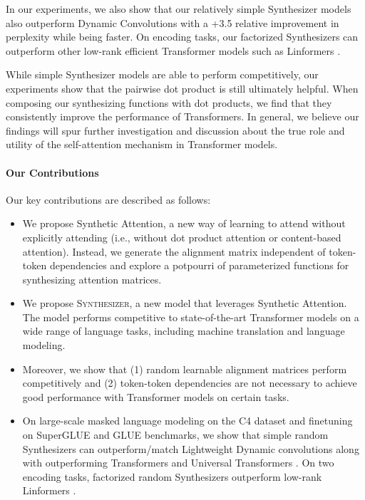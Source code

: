 \documentclass{article}
\begin{document}
In our experiments, we also show that our relatively simple Synthesizer models also outperform Dynamic Convolutions \citep{wu2019pay} with a +3.5 relative improvement in perplexity while being  faster. On encoding tasks, our factorized Synthesizers can outperform other low-rank efficient Transformer models such as Linformers \citep{wang2020linformer}.

While simple Synthesizer models are able to perform competitively, our experiments show that the pairwise dot product is still ultimately helpful. When composing our synthesizing functions with dot products, we find that they consistently improve the performance of Transformers. In general, we believe our findings will spur further investigation and discussion about the true role and utility of the self-attention mechanism in Transformer models.



\paragraph{Our Contributions}
Our key contributions are described as follows:
\begin{itemize}
\item We propose Synthetic Attention, a new way of learning to attend without explicitly attending (i.e., without dot product attention or content-based attention). Instead, we generate the alignment matrix independent of token-token dependencies and explore a potpourri of parameterized functions for synthesizing attention matrices. 
\item We propose \textsc{Synthesizer}, a new model that leverages Synthetic Attention. The model performs competitive to state-of-the-art Transformer models on a wide range of language tasks, including machine translation and language modeling. 
\item Moreover, we show that (1) random learnable alignment matrices perform competitively and (2) token-token dependencies are not necessary to achieve good performance with Transformer models on certain tasks. 
\item On large-scale masked language modeling on the C4 dataset \citep{raffel2019exploring} and finetuning on SuperGLUE and GLUE benchmarks, we show that simple random Synthesizers can outperform/match Lightweight Dynamic convolutions \citep{wu2019pay} along with outperforming Transformers and Universal Transformers \citep{dehghani2018universal}. On two encoding tasks, factorized random Synthesizers outperform low-rank Linformers \citep{wang2020linformer}.
\end{itemize}
\end{document}
